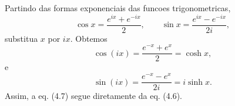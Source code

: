 Partindo das formas exponenciais das funcoes trigonometricas,
\[
\cos x = \frac{e^{ix}+e^{-ix}}{2},
\qquad
\sin x = \frac{e^{ix}-e^{-ix}}{2i},
\]
substitua $x$ por $ix$. Obtemos
\[
\cos(ix) = \frac{e^{-x}+e^x}{2} = \cosh x,
\]
e
\[
\sin(ix) = \frac{e^{-x}-e^x}{2i} = i\sinh x.
\]
Assim, a eq. (4.7) segue diretamente da eq. (4.6).

